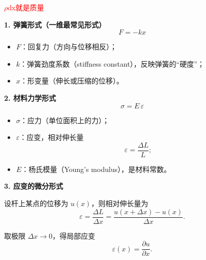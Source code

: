 \textcolor{red}{$\rho$dx就是质量}
\begin{theorem}

\textbf{1. 弹簧形式（一维最常见形式）}
\[
F = -k x
\]
\begin{itemize}
  \item $F$：回复力（方向与位移相反）；
  \item $k$：弹簧劲度系数（stiffness constant），反映弹簧的“硬度”；
  \item $x$：形变量（伸长或压缩的位移）。
\end{itemize}

\textbf{2. 材料力学形式}
\[
\sigma = E \, \varepsilon
\]
\begin{itemize}
  \item $\sigma$：应力（单位面积上的力）；
  \item $\varepsilon$：应变，相对伸长量
    \[
    \varepsilon = \frac{\Delta L}{L};
    \]
  \item $E$：杨氏模量（Young’s modulus），是材料常数。
\end{itemize}

\textbf{3. 应变的微分形式}

设杆上某点的位移为 $u(x)$，则相对伸长量为
\[
\varepsilon = \frac{\Delta L}{\Delta x}
= \frac{u(x+\Delta x) - u(x)}{\Delta x}.
\]

取极限 $\Delta x \to 0$，得局部应变
\[
\varepsilon(x) = \frac{\partial u}{\partial x}.
\]

\end{theorem}

